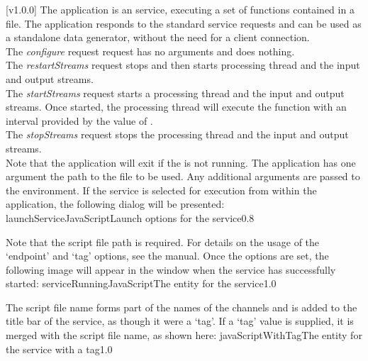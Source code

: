 [v1.0.0]
The  application is an  service,
executing a set of \JS{} functions contained in a file.
The application responds to the standard  service requests and can be used
as a standalone data generator, without the need for a client connection.\\

The \emph{configure} request request has no arguments and does nothing.\\

The \emph{restartStreams} request stops and then starts processing thread and the input
and output streams.\\

The \emph{startStreams} request starts a processing thread and the input and output
streams.
Once started, the processing thread will execute the  function with
an interval provided by the value of .\\

The \emph{stopStreams} request stops the processing thread and the input and output
streams.\\ 

Note that the application will exit if the \emph{\RS} is not running.
The application has one argument \longDash{} the path to the \JS{} file to be used.
Any additional arguments are passed to the \JS{} environment.
\insertAppParameters
\insertTagDescription{\JSIO}
\insertFilterServiceComment
\condPage
\insertStandardServiceCommands
\secondaryEnd
\condPage
{}
If the service is selected for execution from within the \emph{\MMMU} application, the
following dialog will be presented:
%
{launchServiceJavaScript}{Launch options for the \emph{\JSIO} service}{0.8}

Note that the script file path is required.
For details on the usage of the `endpoint' and `tag' options, see the \emph{\MMMU} manual.
Once the options are set, the following image will appear in the \emph{\MMMU} window when
the service has successfully started:
%
{serviceRunningJavaScript}{The \emph{\MMMU} entity for the \emph{\JSIO} service}{1.0}

The script file name forms part of the names of the channels and is added to the title bar
of the service, as though it were a `tag'.
\condPage{}
If a `tag' value is supplied, it is merged with the script file name, as shown here:
%
{javaScriptWithTag}{The \emph{\MMMU} entity for the \emph{\JSIO} service with a tag}{1.0}

